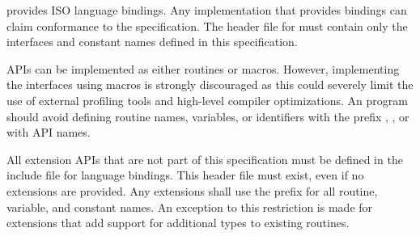 \openshmem provides ISO \Cstd language bindings. Any implementation that
provides \Cstd bindings can claim conformance to the specification. The
\openshmem header file  for \Cstd must contain only the
interfaces and constant names defined in this specification.

\openshmem \acp{API} can be implemented as either routines or macros. However,
implementing the interfaces using macros is strongly discouraged as this could
severely limit the use of external profiling tools and high-level compiler
optimizations. An \openshmem program should avoid defining routine names,
variables, or identifiers with the prefix \shmemprefix, \shmemprefixC, or with
\openshmem \ac{API} names.

All \openshmem extension \acp{API} that are not part of this specification must
be defined in the  include file for language bindings. This
header file must exist, even if no extensions are provided. Any extensions
shall use the  prefix for all routine, variable, and constant
names. An exception to this restriction is made for \openshmem extensions
that add support for additional types to existing \openshmem routines.
